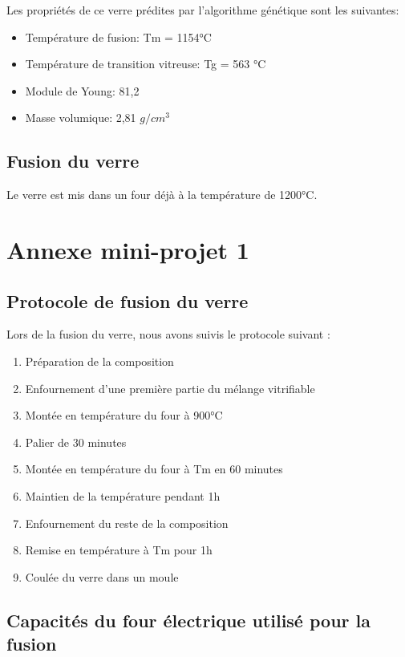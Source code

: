 \documentclass{article}
\begin{document}
Les propriétés de ce verre prédites par l'algorithme génétique sont les suivantes:
\begin{itemize}
    \item Température de fusion: Tm = 1154°C
    \item Température de transition vitreuse: Tg = 563 °C 
    \item Module de Young: 81,2
    \item Masse volumique: 2,81 $g/cm^{3}$
\end{itemize}

\subsection{Fusion du verre}

Le verre est mis dans un four déjà à la température de 1200°C.

\section{Annexe mini-projet 1}
\subsection{Protocole de fusion du verre}

Lors de la fusion du verre, nous avons suivis le protocole suivant :

\begin{enumerate}
    \item Préparation de la composition
    \item Enfournement d'une première partie du mélange vitrifiable
    \item Montée en température du four à 900°C
    \item Palier de 30 minutes
    \item Montée en température du four à Tm en 60 minutes
    \item Maintien de la température pendant 1h
    \item Enfournement du reste de la composition
    \item Remise en température à Tm pour 1h
    \item Coulée du verre dans un moule
\end{enumerate}

\subsection{Capacités du four électrique utilisé pour la fusion}
\end{document}

